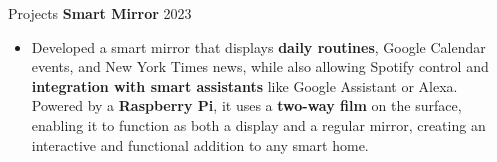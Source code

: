 \documentclass{resume} %
\begin{document}
\begin{rSection}{Projects}
\textbf{Smart Mirror} \hfill 2023\
 \begin{itemize}
 \item
    Developed a smart mirror that displays \textbf{daily routines}, Google Calendar events, and New York Times news, while also allowing Spotify control and \textbf{integration with smart assistants} like Google Assistant or Alexa. Powered by a \textbf{Raspberry Pi}, it uses a \textbf{two-way film} on the surface, enabling it to function as both a display and a regular mirror, creating an interactive and functional addition to any smart home.
 \end{itemize}
 


\end{rSection} 



\end{document}

